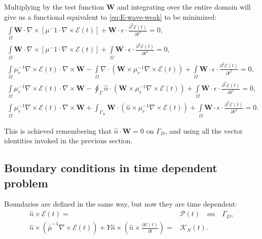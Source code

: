 Multiplying by the test function $\mathbf{W}$ and integrating over the entire domain will give us a functional equivalent to \ref{eq:E-wave-weak} to be minimized: 
\begin{align}
\int\limits_{\Omega}\mathbf{W}\cdot\nabla\times\left[\mu^-1\cdot\nabla \times\mathcal{E}(t)\right] + \mathbf{W}\cdot\epsilon\cdot\frac{\partial ^2\mathcal{E}(t)}{\partial t^2}=0,\nonumber\\
\int\limits_{\Omega}\mathbf{W}\cdot\nabla\times\left[\mu^-1\cdot\nabla \times\mathcal{E}(t)\right] +\int\limits_{\Omega} \mathbf{W}\cdot\epsilon\cdot\frac{\partial ^2\mathcal{E}(t)}{\partial t^2}=0 \nonumber,\\
\int\limits_{\Omega} \mu_r^{-1}\nabla\times \mathcal{E}(t)\cdot \nabla\times\mathbf{W}-\int\limits_{\Omega}\nabla\cdot
\left(\mathbf{W}\times\mu_r^{-1}\nabla\times \mathcal{E}(t)
\right) +\int\limits_{\Omega} \mathbf{W}\cdot\epsilon\cdot\frac{\partial ^2\mathcal{E}(t)}{\partial t^2}=0 \nonumber,\\
\int\limits_{\Omega} \mu_r^{-1}\nabla\times \mathcal{E}(t)\cdot \nabla\times\mathbf{W}-\oint_{\Gamma}\hat{n}\cdot
\left(\mathbf{W}\times\mu_r^{-1}\nabla \times\mathcal{E}(t)\right)  +\int\limits_{\Omega} \mathbf{W}\cdot\epsilon\cdot\frac{\partial ^2\mathcal{E}(t)}{\partial t^2}=0 \nonumber,\\
\int\limits_{\Omega} \mu_r^{-1}\nabla\times \mathcal{E}(t)\cdot \nabla\times\mathbf{W}
+\int_{\Gamma_N}\mathbf{W}\cdot
\left(\hat{n}\times\mu_r^{-1}\nabla \times\mathcal{E}(t)\right)
+\int\limits_{\Omega} \mathbf{W}\cdot\epsilon\cdot\frac{\partial ^2\mathcal{E}(t)}{\partial t^2}=0. \label{eq:time_dependent_Electric}
\end{align}

This is achieved remembering that $\hat{n}\cdot\mathbf{W} =0$ on $\Gamma_D$, and using all the vector identities invoked in the previous section.

\subsection{Boundary conditions in time dependent problem}
Boundaries are defined in the same way, but now they are time dependent:
\begin{align}
\hat{n}\times\mathcal{E}(t)=&\mathcal{P}(t)\quad on \quad \Gamma_D,\\
\hat{n}\times\left(\bar{\bar{\mu}}^{-1}\nabla\times\mathcal{E}(t)
\right)+Y\hat{n}\times\left(\hat{n}\times\frac{\partial\mathcal{E} (t)}{\partial t}\right)=& \mathcal{K}_N(t).
\end{align}


